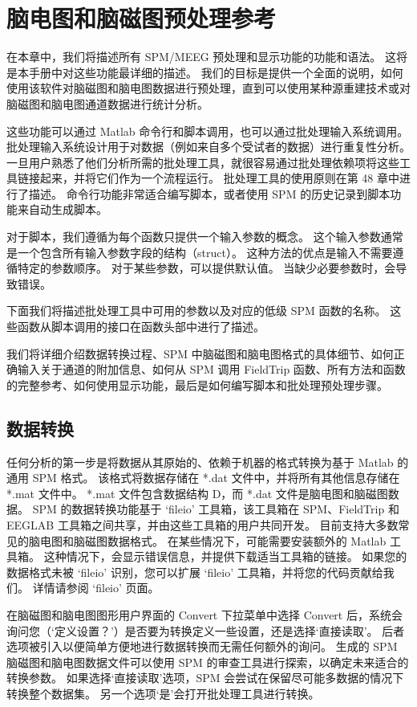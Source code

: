 \chapter{脑电图和脑磁图预处理参考}
\label{ch:12}


在本章中，我们将描述所有 SPM/MEEG 预处理和显示功能的功能和语法。
这将是本手册中对这些功能最详细的描述。
我们的目标是提供一个全面的说明，如何使用该软件对脑磁图和脑电图数据进行预处理，直到可以使用某种源重建技术或对脑磁图和脑电图通道数据进行统计分析。

这些功能可以通过 Matlab 命令行和脚本调用，也可以通过批处理输入系统调用。
批处理输入系统设计用于对数据（例如来自多个受试者的数据）进行重复性分析。
一旦用户熟悉了他们分析所需的批处理工具，就很容易通过批处理依赖项将这些工具链接起来，并将它们作为一个流程运行。
批处理工具的使用原则在第 48 章中进行了描述。
命令行功能非常适合编写脚本，或者使用 SPM 的历史记录到脚本功能来自动生成脚本。

对于脚本，我们遵循为每个函数只提供一个输入参数的概念。
这个输入参数通常是一个包含所有输入参数字段的结构（struct）。
这种方法的优点是输入不需要遵循特定的参数顺序。
对于某些参数，可以提供默认值。
当缺少必要参数时，会导致错误。

下面我们将描述批处理工具中可用的参数以及对应的低级 SPM 函数的名称。
这些函数从脚本调用的接口在函数头部中进行了描述。


我们将详细介绍数据转换过程、SPM 中脑磁图和脑电图格式的具体细节、如何正确输入关于通道的附加信息、如何从 SPM 调用 FieldTrip 函数、所有方法和函数的完整参考、如何使用显示功能，最后是如何编写脚本和批处理预处理步骤。


\section{数据转换}

任何分析的第一步是将数据从其原始的、依赖于机器的格式转换为基于 Matlab 的通用 SPM 格式。
该格式将数据存储在 *.dat 文件中，并将所有其他信息存储在 *.mat 文件中。
*.mat 文件包含数据结构 D，而 *.dat 文件是脑电图和脑磁图数据。
SPM 的数据转换功能基于 ‘fileio’ 工具箱，该工具箱在 SPM、FieldTrip 和 EEGLAB 工具箱之间共享，并由这些工具箱的用户共同开发。
目前支持大多数常见的脑电图和脑磁图数据格式。
在某些情况下，可能需要安装额外的 Matlab 工具箱。
这种情况下，会显示错误信息，并提供下载适当工具箱的链接。
如果您的数据格式未被 ‘fileio’ 识别，您可以扩展 ‘fileio’ 工具箱，并将您的代码贡献给我们。
详情请参阅 ‘fileio’ 页面。
 
在脑磁图和脑电图图形用户界面的 Convert 下拉菜单中选择 Convert 后，系统会询问您（‘定义设置？’）是否要为转换定义一些设置，还是选择‘直接读取’。
后者选项被引入以便简单方便地进行数据转换而无需任何额外的询问。
生成的 SPM 脑磁图和脑电图数据文件可以使用 SPM 的审查工具进行探索，以确定未来适合的转换参数。
如果选择‘直接读取’选项，SPM 会尝试在保留尽可能多数据的情况下转换整个数据集。
另一个选项‘是’会打开批处理工具进行转换。
 
